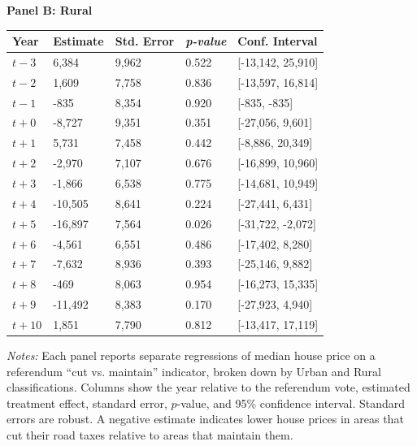 \begin{table}[htbp]
\begin{threeparttable}
    \centering
    \textbf{Panel B: Rural} \\[4pt]
    \begin{tabularx}{\textwidth}{l*{4}{X}}
    \hline
    \textbf{Year} & \textbf{Estimate} & \textbf{Std. Error} & \textbf{\textit{p-value}} & \textbf{Conf. Interval} \\
    \hline
    $t - 3$  & 6,384  & 9,962  & 0.522 & [-13,142, 25,910] \\
    $t - 2$  & 1,609  & 7,758  & 0.836 & [-13,597, 16,814] \\
    $t - 1$  & -835   & 8,354  & 0.920 & [-835, -835] \\
    $t + 0$  & -8,727 & 9,351  & 0.351 & [-27,056, 9,601] \\
    $t + 1$  & 5,731  & 7,458  & 0.442 & [-8,886, 20,349] \\
    $t + 2$  & -2,970 & 7,107  & 0.676 & [-16,899, 10,960] \\
    $t + 3$  & -1,866 & 6,538  & 0.775 & [-14,681, 10,949] \\
    $t + 4$  & -10,505 & 8,641 & 0.224 & [-27,441, 6,431] \\
    $t + 5$  & -16,897 & 7,564 & 0.026 & [-31,722, -2,072] \\
    $t + 6$  & -4,561 & 6,551  & 0.486 & [-17,402, 8,280] \\
    $t + 7$  & -7,632 & 8,936  & 0.393 & [-25,146, 9,882] \\
    $t + 8$  & -469   & 8,063  & 0.954 & [-16,273, 15,335] \\
    $t + 9$  & -11,492 & 8,383 & 0.170 & [-27,923, 4,940] \\
    $t + 10$ & 1,851  & 7,790  & 0.812 & [-13,417, 17,119] \\
    \hline
    \end{tabularx}
    
    \begin{tablenotes}
    \small
    \item \textit{Notes:} Each panel reports separate regressions of median house price on a referendum “cut vs. maintain” indicator, broken down by Urban and Rural classifications. Columns show the year relative to the referendum vote, estimated treatment effect, standard error, \(p\)-value, and 95\% confidence interval. Standard errors are robust. A negative estimate indicates lower house prices in areas that cut their road taxes relative to areas that maintain them.
    \end{tablenotes}
    \end{threeparttable}
\end{table}

